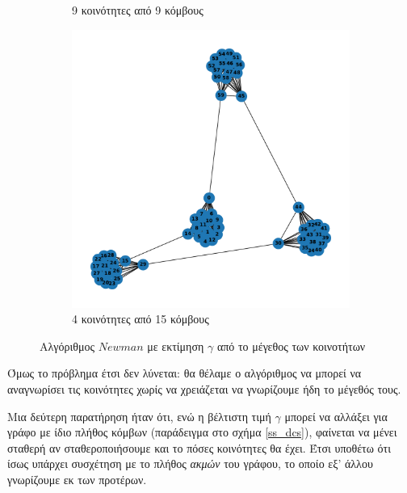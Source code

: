 \documentclass[12pt, letterpaper]{article}
\begin{document}
\begin{figure}[h]
\begin{subfigure}{0.3\textwidth}
      \caption{9 κοινότητες από 9 κόμβους}
      \label{9b}
  \end{subfigure}
  \begin{subfigure}{0.3\textwidth}
      \includegraphics[width=\textwidth]{cluster_4,15newman_auto.pdf}
      \caption{4 κοινότητες από 15 κόμβους}
      \label{9c}
  \end{subfigure}
  \caption{Αλγόριθμος $Newman$ με εκτίμηση $\gamma$ από το μέγεθος των κοινοτήτων}
  \label{auto_cluster_size}
\end{figure}







Όμως το πρόβλημα έτσι δεν λύνεται: θα θέλαμε ο αλγόριθμος να μπορεί να αναγνωρίσει 
τις κοινότητες χωρίς να χρειάζεται να γνωρίζουμε ήδη το μέγεθός τους. 


Μια δεύτερη παρατήρηση ήταν ότι, ενώ η βέλτιστη τιμή $\gamma$ μπορεί να αλλάξει για γράφο 
με ίδιο πλήθος κόμβων (παράδειγμα στο σχήμα \ref{ss_dcs}), φαίνεται να μένει σταθερή αν σταθεροποιήσουμε και το πόσες 
κοινότητες θα έχει. Έτσι υποθέτω ότι ίσως υπάρχει συσχέτηση με το πλήθος \emph{ακμών} του γράφου,
το οποίο εξ' άλλου γνωρίζουμε εκ των προτέρων. 
\end{document}
